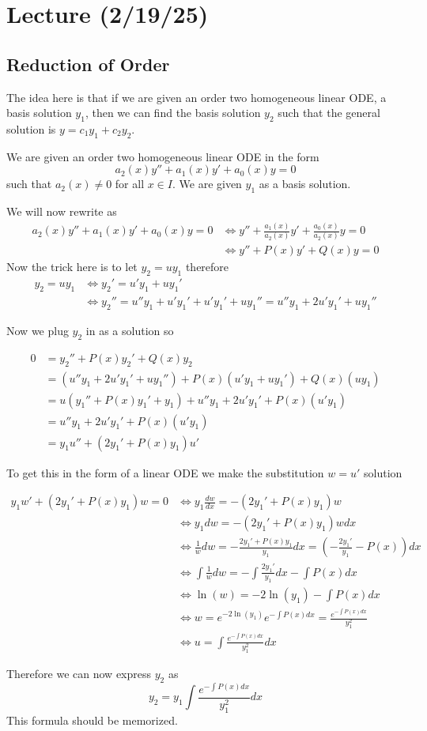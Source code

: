 \documentclass[notes]{subfiles}
\begin{document}
\setcounter{section}{9}
\section{Lecture (2/19/25)}
\subsection{Reduction of Order}
The idea here is that if we are given an order two homogeneous linear ODE, a basis solution $y_1$, then we can find the basis solution $y_2$ such that the general solution is $y = c_1y_1 + c_2y_2$.

We are given an order two homogeneous linear ODE in the form
\[
    a_2(x)y'' + a_1(x)y' + a_0(x)y = 0
\]
such that $a_2(x) \neq 0$ for all $x \in I$. We are given $y_1$ as a basis solution.

We will now rewrite as
\begin{align*}
    a_2(x)y'' + a_1(x)y' + a_0(x)y = 0
    &\iff y'' + \frac{a_1(x)}{a_2(x)}y' + \frac{a_0(x)}{a_2(x)}y = 0 \\
    &\iff y'' + P(x)y' + Q(x)y = 0
\end{align*}
Now the trick here is to let $y_2 = uy_1$ therefore
\begin{align*}
    y_2 = uy_1
    &\iff y_2' = u'y_1 + uy_1' \\
    &\iff y_2'' = u''y_1 + u'y_1' + u'y_1' + uy_1'' = u''y_1 + 2u'y_1' + uy_1'' %
\end{align*}

Now we plug $y_2$ in as a solution so

\begin{align*}
    0
    &= y_2'' + P(x)y_2' + Q(x)y_2 \\
    &= (u''y_1 + 2u'y_1' + uy_1'') + P(x)(u'y_1 + uy_1') + Q(x)(uy_1) \\
    &= u(y_1'' + P(x)y_1' + y_1) + u''y_1 + 2u'y_1' + P(x)(u'y_1) \\
    &= u''y_1 + 2u'y_1' + P(x)(u'y_1) \\
    &= y_1u'' + (2y_1' + P(x)y_1)u'
\end{align*}

To get this in the form of a linear ODE we make the substitution $w = u'$ solution

\begin{align*}
    y_1w' + (2y_1' + P(x)y_1)w = 0
    &\iff y_1\frac{dw}{dx} = -(2y_1' + P(x)y_1)w \\
    &\iff y_1dw = -(2y_1' + P(x)y_1)wdx \\
    &\iff \frac{1}{w}dw = -\frac{2y_1' + P(x)y_1}{y_1}dx = \left( -\frac{2y_1'}{y_1} - P(x) \right)dx \\
    &\iff \int \frac{1}{w}dw = -\int \frac{2y_1'}{y_1}dx - \int P(x)dx \\
    &\iff \ln(w) = -2\ln(y_1) - \int P(x)dx \\
    &\iff w = e^{-2\ln(y_1)}e^{-\int P(x)dx} = \frac{e^{-\int P(x)dx}}{y_1^2} \\
    &\iff u = \int \frac{e^{-\int P(x)dx}}{y_1^2} dx
\end{align*}

Therefore we can now express $y_2$ as
\[
    y_2 = y_1\int \frac{e^{-\int P(x)dx}}{y_1^2} dx
\]
This formula should be memorized.
\end{document}
